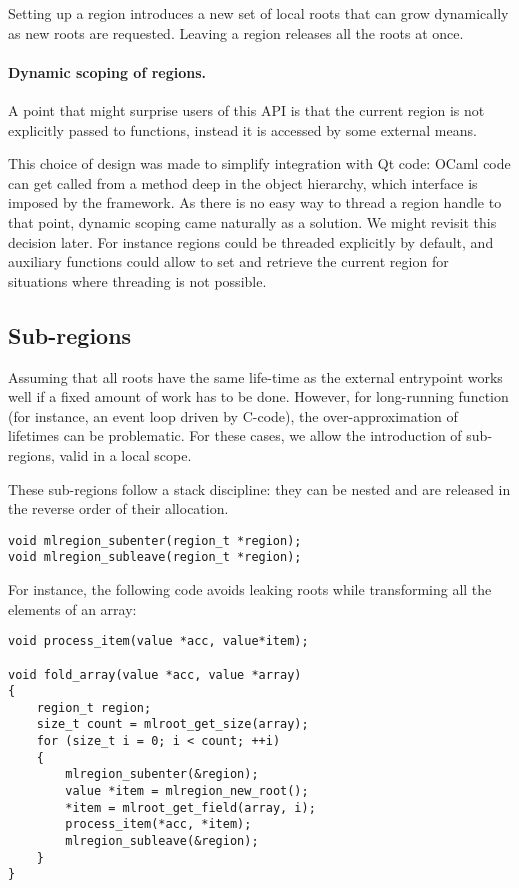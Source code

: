 \documentclass[a4paper]{easychair}
\begin{document}
Setting up a region introduces a new set of local roots that can grow
dynamically as new roots are requested. Leaving a region releases all
the roots at once.

\paragraph{Dynamic scoping of regions.} A point that might surprise users of
this API is that the current region is not explicitly passed to functions,
instead it is accessed by some external means.

This choice of design was made to simplify integration with Qt code: OCaml code
can get called from a method deep in the object hierarchy, which interface is
imposed by the framework. As there is no easy way to thread a region handle to
that point, dynamic scoping came naturally as a solution. We might revisit this
decision later. For instance regions could be threaded explicitly by default,
and auxiliary functions could allow to set and retrieve the current region for
situations where threading is not possible.

\subsection{Sub-regions}

Assuming that all roots have the same life-time as the external
entrypoint works well if a fixed amount of work has to be done. However,
for long-running function (for instance, an event loop driven by
C-code), the over-approximation of lifetimes can be problematic. For
these cases, we allow the introduction of sub-regions, valid in a local
scope.

These sub-regions follow a stack discipline: they can be nested and are
released in the reverse order of their allocation.
%
\begin{lstlisting}[style=C++]
void mlregion_subenter(region_t *region);
void mlregion_subleave(region_t *region);
\end{lstlisting}

For instance, the following code avoids leaking roots while transforming
all the elements of an array:
%
\begin{lstlisting}[style=C++]
void process_item(value *acc, value*item);

void fold_array(value *acc, value *array)
{
    region_t region;
    size_t count = mlroot_get_size(array);
    for (size_t i = 0; i < count; ++i)
    {
        mlregion_subenter(&region);
        value *item = mlregion_new_root();
        *item = mlroot_get_field(array, i);
        process_item(*acc, *item);
        mlregion_subleave(&region);
    }
}
\end{lstlisting}
\end{document}
